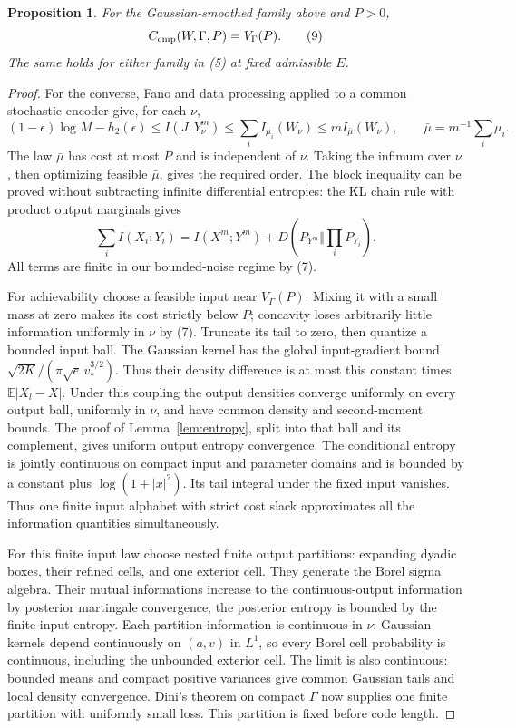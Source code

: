 \documentclass[11pt]{article}
\newtheorem{proposition}[theorem]{Proposition}
\newcommand{\E}{\mathbb E}
\begin{document}
\begin{proposition}\label{prop:compound}
For the Gaussian-smoothed family above and \(P>0\),
\[
 C_{\rm cmp}(W,\Gamma,P)=V_\Gamma(P).                        \tag{9}
\]
The same holds for either family in (5) at fixed admissible \(E\).
\end{proposition}
\begin{proof}
For the converse, Fano and data processing applied to a common stochastic
encoder give, for each \(\nu\),
\[
 (1-\epsilon)\log M-h_2(\epsilon)
 \leq I(J;Y_\nu^m)\leq\sum_i I_{\mu_i}(W_\nu)
 \leq mI_{\bar\mu}(W_\nu),\qquad
 \bar\mu=m^{-1}\sum_i\mu_i .
\]
The law \(\bar\mu\) has cost at most \(P\) and is independent of \(\nu\).
Taking the infimum over \(\nu\), then optimizing feasible \(\bar\mu\),
gives the required order. The block inequality can be proved without
subtracting infinite differential entropies: the KL chain rule with
product output marginals gives
\[
 \sum_i I(X_i;Y_i)=I(X^m;Y^m)
             +D(P_{Y^m}\Vert\textstyle\prod_i P_{Y_i}).
\]
All terms are finite in our bounded-noise regime by (7).

For achievability choose a feasible input near \(V_\Gamma(P)\).
Mixing it with a small mass at zero makes its cost strictly below \(P\);
concavity loses arbitrarily little information uniformly in \(\nu\)
by (7). Truncate its tail to zero, then quantize a bounded input ball.
The Gaussian kernel has the global input-gradient bound
\(\sqrt{2K}/(\pi\sqrt e\,v_*^{3/2})\).
Thus their density difference is at most this constant times
\(\E|X_l-X|\). Under this coupling the output densities converge uniformly
on every output ball, uniformly in \(\nu\), and have common density and
second-moment bounds. The proof of Lemma~\ref{lem:entropy}, split into
that ball and its complement, gives uniform output entropy convergence.
The conditional entropy is jointly continuous on compact input and
parameter domains and is bounded by a constant plus
\(\log(1+|x|^2)\). Its tail integral under the fixed input vanishes.
Thus one finite input alphabet with strict cost slack approximates all
the information quantities simultaneously.

For this finite input law choose nested finite output partitions:
expanding dyadic boxes, their refined cells, and one exterior cell.
They generate the Borel sigma algebra. Their mutual informations
increase to the continuous-output information by posterior martingale
convergence; the posterior entropy is bounded by the finite input entropy.
Each partition information is continuous in \(\nu\): Gaussian kernels
depend continuously on \((a,v)\) in \(L^1\), so every Borel cell
probability is continuous, including the unbounded exterior cell.
The limit is also continuous: bounded means and compact positive
variances give common Gaussian tails and local density convergence.
Dini's theorem on compact \(\Gamma\) now supplies one finite partition
with uniformly small loss. This partition is fixed before code length.


\end{proof}
\end{document}
